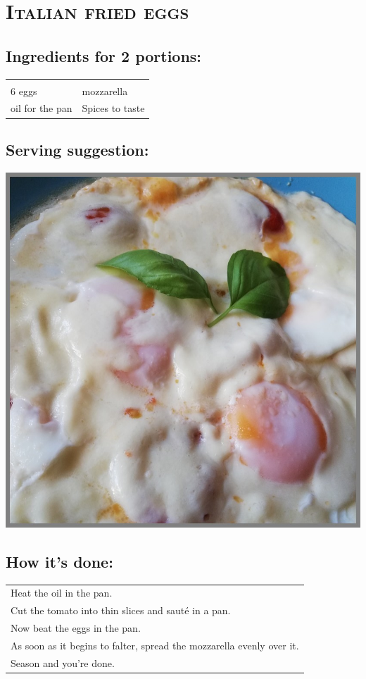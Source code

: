 \section{\textsc{Italian fried eggs}}

\subsection*{Ingredients for 2 portions:}

\begin{tabular}{p{7.5cm} p{7.5cm}}
	& \\
	6 eggs & mozzarella \\
	oil for the pan & Spices to taste
\end{tabular}

\subsection*{Serving suggestion:}

\includegraphics[width=\textwidth]{img/spiegelei_ita.jpg} \cite{itaspiegelei}

\subsection*{How it's done:}

\begin{tabular}{p{15cm}}
	\\
  Heat the oil in the pan.\\
  Cut the tomato into thin slices and sauté in a pan.\\
  Now beat the eggs in the pan.\\
  As soon as it begins to falter, spread the mozzarella evenly over it.\\
  Season and you're done.
\end{tabular}
